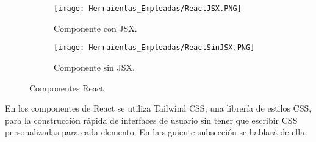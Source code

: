 \begin{figure}[ht!]

  \begin{subfigure}{\textwidth}
    \centering
    \texttt{[image: Herraientas\_Empleadas/ReactJSX.PNG]}
    \caption{Componente con JSX.}
    \label{JSX}
  \end{subfigure}

  \begin{subfigure}{\textwidth}
    \centering
    \texttt{[image: Herraientas\_Empleadas/ReactSinJSX.PNG]}
    \caption{Componente sin JSX.}
    \label{SJSX}
  \end{subfigure}
  \caption{Componentes React}
  \label{fig:react}
\end{figure}

En los componentes de React se utiliza Tailwind CSS, una librería de estilos CSS, para la construcción rápida de interfaces de usuario sin tener que escribir CSS personalizadas para cada elemento. En la siguiente subsección se hablará de ella.

